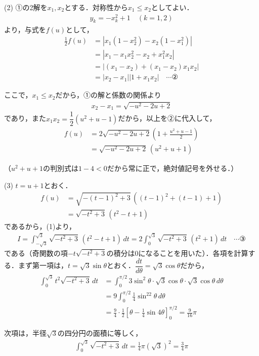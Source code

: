 \documentclass[../main.tex]{subfiles}
\begin{document}
(2) ①の2解を$x_1,x_2$とする．対称性から$x_1\le x_2$としてよい．
\begin{align*}
  y_k=-x_k^2+1\quad(k=1,2)
\end{align*}
より，与式を$f(u)$として，
\begin{align*}
  \frac12f(u)&=\left|x_1(1-x_2^2)-x_2(1-x_1^2)\right|\\
  &=\left|x_1-x_1x_2^2-x_2+x_1^2x_2\right|\\
  &=\left|(x_1-x_2)+(x_1-x_2)x_1x_2\right|\\
  &=|x_2-x_1||1+x_1x_2|\quad\cdots②
\end{align*}

ここで，$x_1\le x_2$だから，①の解と係数の関係より
\begin{align*}
  x_2-x_1=\sqrt{-u^2-2u+2}
\end{align*}
であり，また$x_1x_2=\dfrac12(u^2+u-1)$だから，以上を②に代入して，
\begin{align*}
  f(u)&=2\sqrt{-u^2-2u+2}\left(1+\frac{u^2+u-1}2\right)\\
  &=\sqrt{-u^2-2u+2}\,(u^2+u+1)
\end{align*}

（$u^2+u+1$の判別式は$1-4<0$だから常に正で，絶対値記号を外せる．）

(3) $t=u+1$とおく．
\begin{align*}
  f(u)&=\sqrt{-(t-1)^2+3}\,\left((t-1)^2+(t-1)+1\right)\\
  &=\sqrt{-t^2+3}\,(t^2-t+1)
\end{align*}
であるから，(1)より，
\begin{align*}
  I=\int_{-\sqrt3}^{\sqrt3}\sqrt{-t^2+3}\,(t^2-t+1)\,dt=2\int_0^{\sqrt3}\sqrt{-t^2+3}\,(t^2+1)\,dt\quad\cdots③
\end{align*}
である（奇関数の項$-t\sqrt{-t^2+3}$の積分は$0$になることを用いた）．各項を計算する．まず第一項は，$t=\sqrt3\sin\theta$とおく．$\dfrac{dt}{d\theta}=\sqrt3\cos\theta$だから，
\begin{align*}
  \int_0^{\sqrt3}t^2\sqrt{-t^2+3}\,dt&=\int_0^{\pi/2}3\sin^2\theta\cdot\sqrt3\cos\theta\cdot\sqrt3\cos\theta\,d\theta\\
  &=9\int_0^{\pi/2}\frac14\sin^22\theta\,d\theta\\
  &=\frac94\cdot\frac12\left[\theta-\frac14\sin4\theta\right]_0^{\pi/2}=\frac9{16}\pi
\end{align*}

次項は，半径$\sqrt3$の四分円の面積に等しく，
\begin{align*}
  \int_0^{\sqrt3}\sqrt{-t^2+3}\,dt=\frac14\pi(\sqrt3)^2=\frac34\pi
\end{align*}
\end{document}
